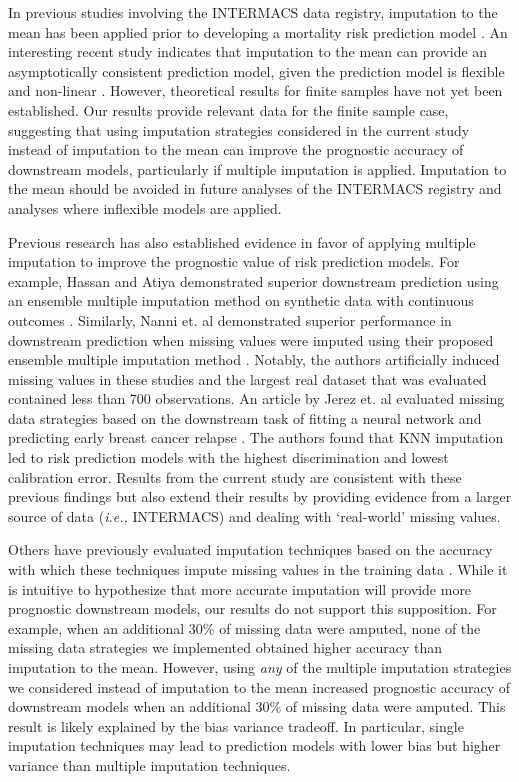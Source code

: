 \documentclass{article}
\begin{document}
In previous studies involving the INTERMACS data registry, imputation to
the mean has been applied prior to developing a mortality risk
prediction model
\cite{hsich2012should, cotts2014predictors, eckman2011survival, kirklin2017eighth, kormos2019society, Adamo950}.
An interesting recent study indicates that imputation to the mean can
provide an asymptotically consistent prediction model, given the
prediction model is flexible and non-linear \cite{josse2019consistency}.
However, theoretical results for finite samples have not yet been
established. Our results provide relevant data for the finite sample
case, suggesting that using imputation strategies considered in the
current study instead of imputation to the mean can improve the
prognostic accuracy of downstream models, particularly if multiple
imputation is applied. Imputation to the mean should be avoided in
future analyses of the INTERMACS registry and analyses where inflexible
models are applied.

Previous research has also established evidence in favor of applying
multiple imputation to improve the prognostic value of risk prediction
models. For example, Hassan and Atiya demonstrated superior downstream
prediction using an ensemble multiple imputation method on synthetic
data with continuous outcomes \cite{hassan2007regression}. Similarly,
Nanni et. al demonstrated superior performance in downstream prediction
when missing values were imputed using their proposed ensemble multiple
imputation method \cite{nanni2012classifier}. Notably, the authors
artificially induced missing values in these studies and the largest
real dataset that was evaluated contained less than 700 observations. An
article by Jerez et. al evaluated missing data strategies based on the
downstream task of fitting a neural network and predicting early breast
cancer relapse \cite{jerez2010missing}. The authors found that KNN
imputation led to risk prediction models with the highest discrimination
and lowest calibration error. Results from the current study are
consistent with these previous findings but also extend their results by
providing evidence from a larger source of data
(\textit{i.e., }INTERMACS) and dealing with `real-world' missing values.

Others have previously evaluated imputation techniques based on the
accuracy with which these techniques impute missing values in the
training data
\cite{tutz2015improved, little2013joys, steele2018machine}. While it is
intuitive to hypothesize that more accurate imputation will provide more
prognostic downstream models, our results do not support this
supposition. For example, when an additional 30\% of missing data were
amputed, none of the missing data strategies we implemented obtained
higher accuracy than imputation to the mean. However, using \emph{any}
of the multiple imputation strategies we considered instead of
imputation to the mean increased prognostic accuracy of downstream
models when an additional 30\% of missing data were amputed. This result
is likely explained by the bias variance tradeoff. In particular, single
imputation techniques may lead to prediction models with lower bias but
higher variance than multiple imputation techniques.
\end{document}
